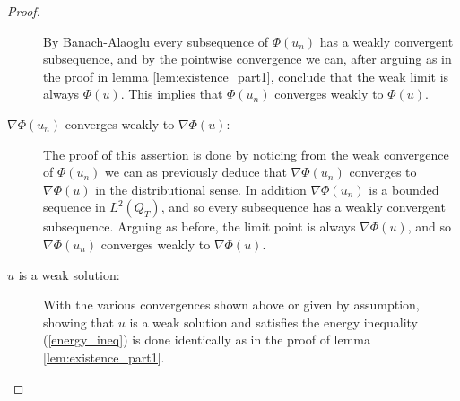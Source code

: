 \documentclass[11pt, a4paper]{article}
\begin{document}
\begin{proof}
\begin{description}
By Banach-Alaoglu every subsequence of $\Phi(u_n)$ has a weakly convergent subsequence, and by the pointwise convergence we can, after arguing as in the proof in lemma \ref{lem:existence_part1}, conclude that the weak limit is always $\Phi(u)$. This implies that $\Phi(u_n)$ converges weakly to $\Phi(u)$.

\item[$\nabla \Phi(u_n)$ converges weakly to $\nabla \Phi(u)$:]
The proof of this assertion is done by noticing from the weak convergence of $\Phi(u_n)$ we can as previously deduce that $\nabla \Phi(u_n)$ converges to $\nabla \Phi(u)$ in the distributional sense. In addition $\nabla \Phi(u_n)$ is a bounded sequence in $L^2(Q_T)$, and so every subsequence has a weakly convergent subsequence. Arguing as before, the limit point is always $\nabla \Phi(u)$, and so $\nabla \Phi(u_n)$ converges weakly to $\nabla \Phi(u)$.


\item[$u$ is a weak solution:]
With the various convergences shown above or given by assumption, showing that $u$ is a weak solution and satisfies the energy inequality (\ref{energy_ineq}) is done identically as in the proof of lemma \ref{lem:existence_part1}.

\end{description}
\end{proof}







\newpage


\end{document}
